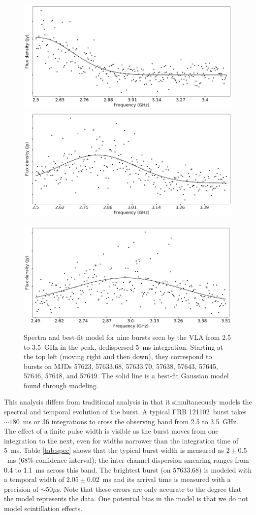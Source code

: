 \documentclass[twocolumn]{aastex61}
\newcommand{\frb}{FRB 121102}
\begin{document}
\begin{figure}[ht]
\begin{center}
 \begin{minipage}{2\columnwidth}
  \includegraphics[width=0.5\columnwidth]{spec_57646.png}
  \includegraphics[width=0.5\columnwidth]{spec_57648.png}
 \end{minipage}

 \begin{minipage}{2\columnwidth}
  \includegraphics[width=0.5\columnwidth]{spec_57649.png}
 \end{minipage}
\caption{Spectra and best-fit model for nine bursts seen by the VLA from 2.5 to 3.5~GHz in the peak, dedispersed 5~ms integration. Starting at the top left (moving right and then down), they correspond to bursts on MJDs 57623, 57633.68, 57633.70, 57638, 57643, 57645, 57646, 57648, and 57649. The solid line is a best-fit Gaussian model found through modeling.
\label{fig:spec}}
\end{center}
\end{figure}

This analysis differs from traditional analysis in that it simultaneously models the spectral and temporal evolution of the burst. A typical \frb\ burst takes $\sim180$~ms or 36 integrations to cross the observing band from 2.5 to 3.5~GHz. The effect of a finite pulse width is visible as the burst moves from one integration to the next, even for widths narrower than the integration time of 5~ms. Table \ref{tab:spec} shows that the typical burst width is measured as $2\pm0.5$~ms (68\% confidence interval); the inter-channel dispersion smearing ranges from 0.4 to 1.1~ms across this band. The brightest burst (on 57633.68) is modeled with a temporal width of $2.05\pm0.02$~ms and its arrival time is measured with a precision of $\sim50\mu$s. Note that these errors are only accurate to the degree that the model represents the data. One potential bias in the model is that we do not model scintillation effects.
\end{document}
